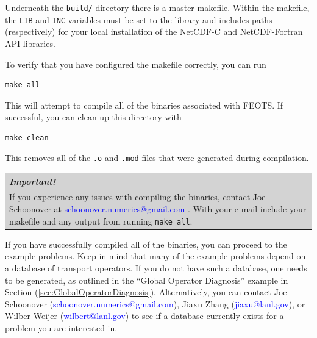 \documentclass{softwaremanual}
\begin{document}
Underneath the \texttt{build/} directory there is a master makefile. Within the makefile, the \texttt{LIB} and \texttt{INC} variables must be set to the library and includes paths (respectively) for your local installation of the NetCDF-C and NetCDF-Fortran API libraries.

To verify that you have configured the makefile correctly, you can run
\begin{verbatim}
make all
\end{verbatim}
This will attempt to compile all of the binaries associated with FEOTS. If successful, you can clean up this directory with 
\begin{verbatim}
make clean
\end{verbatim}
This removes all of the \texttt{.o} and \texttt{.mod} files that were generated during compilation.

\begin{flushleft}
\begingroup\setlength{\fboxsep}{0pt}
  \colorbox{lightgray}{
    \begin{tabular}{p{\textwidth}}
    \textbf{\textit{Important!}}\\
    \midrule
    If you experience any issues with compiling the binaries, contact Joe Schoonover at \textcolor{blue}{schoonover.numerics@gmail.com} . With your e-mail include your makefile and any output from running \texttt{make all}. \\
    \bottomrule
\end{tabular}
}\endgroup
\end{flushleft}
\vspace{0.5cm}

If you have successfully compiled all of the binaries, you can proceed to the example problems. Keep in mind that many of the example problems depend on a database of transport operators. If you do not have such a database, one needs to be generated, as outlined in the ``Global Operator Diagnosis'' example in Section (\ref{sec:GlobalOperatorDiagnosis}). Alternatively, you can contact Joe Schoonover (\textcolor{blue}{schoonover.numerics@gmail.com}), Jiaxu Zhang (\textcolor{blue}{jiaxu@lanl.gov}), or Wilber Weijer (\textcolor{blue}{wilbert@lanl.gov}) to see if a database currently exists for a problem you are interested in.
\end{document}

